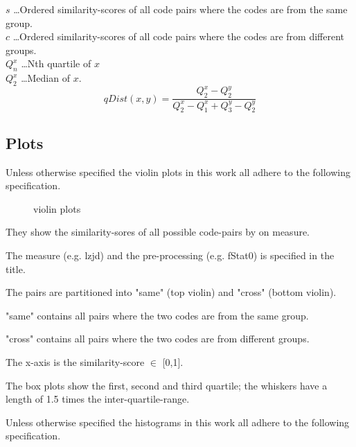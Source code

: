 \documentclass[../main.tex]{subfiles}
\begin{document}
$s$ \dots Ordered similarity-scores of all code pairs where the codes are from the same group.\\
$c$ \dots Ordered similarity-scores of all code pairs where the codes are from different groups.\\
$Q_n^x$ \dots Nth quartile of $x$\\
$Q_2^x$ \dots Median of $x$.
\begin{equation}
  qDist(x,y) = \dfrac{Q_2^x - Q_2^y}{Q_2^x - Q_1^x + Q_3^y - Q_2^y}
  \label{eq:qDist}
\end{equation}

\subsection{Plots}

Unless otherwise specified the violin plots  in this work all adhere to the following specification.

\begin{figure}[ht!]
  \centering

  \caption{violin plots}
  \label{fig:violins}
\end{figure}

\begin{ul}
  \item They show the similarity-sores of all possible code-pairs by on measure.
  \item The measure (e.g. lzjd) and the pre-processing (e.g. fStat0) is specified in the title.
  \item The pairs are partitioned into "same" (top violin) and "cross" (bottom violin).
  \item "same" contains all pairs where the two codes are from the same group.
  \item "cross" contains all pairs where the two codes are from different groups.
  \item The x-axis is the similarity-score \(\in\) [0,1].
  \item The box plots show the first, second and third quartile; the whiskers have a length of 1.5 times the inter-quartile-range.
\end{ul}

Unless otherwise specified the histograms  in this work all adhere to the following specification.
\end{document}
